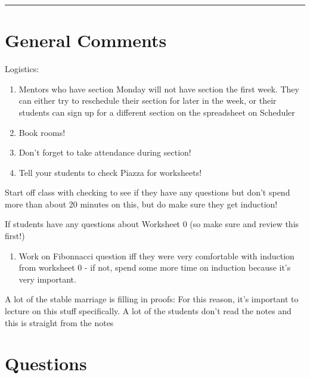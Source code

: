 \documentclass{exam}
\title{}
\date{Quantifiers, Methods of Proof}
\begin{document}
\maketitle
\rule{\textwidth}{0.15em}
\fontsize{12}{15}\selectfont
\thispagestyle{empty}


\section{General Comments}
\begin{questions}
\item Logistics: 
\begin{enumerate}[label=(\alph*)]
\item Mentors who have section Monday will not have section the first week. They can either try to reschedule their section for later in the week, or their students can sign up for a different section on the spreadsheet on Scheduler
\item Book rooms!
\item Don’t forget to take attendance during section!
\item Tell your students to check Piazza for worksheets! 
\end{enumerate}
\item Start off class with checking to see if they have any questions but don’t spend more than about 20 minutes on this, but do make sure they get induction!
\item If students have any questions about Worksheet 0 (so make sure and review this first!)
\begin{enumerate}[label=(\alph*)]
\item Work on Fibonnacci question iff they were very comfortable with induction from worksheet 0 - if not, spend some more time on induction because it’s very important. 
\end{enumerate}
\item A lot of the stable marriage is filling in proofs: For this reason, it’s important to lecture on this stuff specifically. A lot of the students don’t read the notes and this is straight from the notes
\end{questions}

\clearpage 

\section{Questions}
\end{document}
